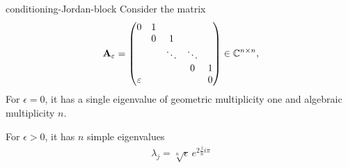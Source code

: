 \begin{Example}{conditioning-Jordan-block}
  Consider the matrix
  \begin{gather}
  \mathbf A_\varepsilon =
      \begin{pmatrix}
        0&1\\
        &0&1\\
        &&\ddots&\ddots\\
        &&&0&1\\
        \varepsilon &&&&0
      \end{pmatrix}
      \in\mathbb C^{n\times n},
  \end{gather}
  For $\epsilon=0$, it has a single eigenvalue of geometric multiplicity one and algebraic multiplicity $n$.
  
  For $\epsilon>0$, it has $n$ simple eigenvalues
  \begin{gather}
      \lambda_j = \sqrt[n]{\epsilon} \,e^{2\frac jni\pi}
  \end{gather}
\end{Example}

